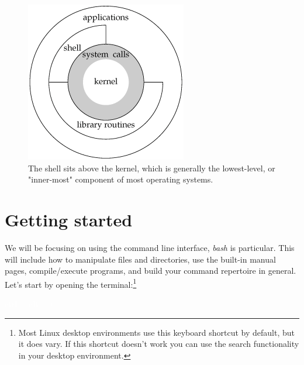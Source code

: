 \documentclass[oneside]{book}
\newcommand{\commandline}[1]{\begin{center} \colorbox{Dark}{\textcolor{white}{#1}} \end{center}}
\begin{document}
\begin{figure}[H]
	\centering
	\includegraphics[scale=0.5]{kernel.png}
	\caption{The shell sits above the kernel, which is generally the lowest-level, or "inner-most" component of most operating systems.} 
\end{figure}

\section{Getting started}
We will be focusing on using the command line interface, \textit{bash} is particular. This will include how to manipulate files and directories, use the built-in manual pages, compile/execute programs, and build your command repertoire in general. Let's start by opening the terminal:\footnote{Most Linux desktop environments use this keyboard shortcut by default, but it does vary. If this shortcut doesn't work you can use the search functionality in your desktop environment.}

\commandline{ctrl + alt + t}


\end{document}
